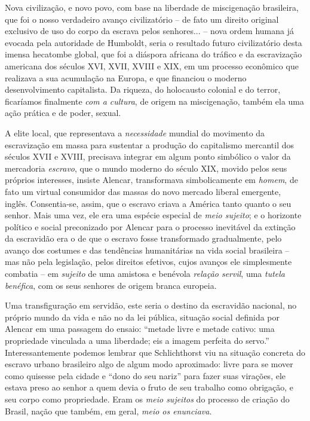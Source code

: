 Nova civilização, e novo povo, com base na liberdade de miscigenação
brasileira, que foi o nosso verdadeiro avanço civilizatório -- de fato
um direito original exclusivo de uso do corpo da escrava pelos
senhores... -- nova ordem humana já evocada pela autoridade de Humboldt,
seria o resultado futuro civilizatório desta imensa hecatombe global,
que foi a diáspora africana do tráfico e da escravização americana dos
séculos XVI, XVII, XVIII e XIX, em um processo econômico que realizava a
sua acumulação na Europa, e que financiou o moderno desenvolvimento
capitalista. Da riqueza, do holocausto colonial e do terror, ficaríamos
finalmente \emph{com a cultura}, de origem na miscigenação, também ela
uma ação prática e de poder, sexual.

A elite local, que representava a \emph{necessidade} mundial do
movimento da escravização em massa para sustentar a produção do
capitalismo mercantil dos séculos XVII e XVIII, precisava integrar em
algum ponto simbólico o valor da mercadoria \emph{escravo}, que o mundo
moderno do século XIX, movido pelos seus próprios interesses, insiste
Alencar, transformava simbolicamente em \emph{homem}, de fato um virtual
consumidor das massas do novo mercado liberal emergente, inglês.
Consentia-se, assim, que o escravo criava a América tanto quanto o seu
senhor. Mais uma vez, ele era uma espécie especial de \emph{meio
sujeito}; e o horizonte político e social preconizado por Alencar para o
processo inevitável da extinção da escravidão era o de que o escravo
fosse transformado gradualmente, pelo avanço dos costumes e das
tendências humanitárias na vida social brasileira -- mas não pela
legislação, pelos direitos efetivos, cujos avanços ele simplesmente
combatia -- em \emph{sujeito} de uma amistosa e benévola \emph{relação
servil}, uma \emph{tutela benéfica}, com os seus senhores de origem
branca europeia.

Uma transfiguração em servidão, este seria o destino da escravidão
nacional, no próprio mundo da vida e não no da lei pública, situação
social definida por Alencar em uma passagem do ensaio: ``metade livre e
metade cativo: uma propriedade vinculada a uma liberdade; eis a imagem
perfeita do servo.'' Interessantemente podemos lembrar que Schlichthorst
viu na situação concreta do escravo urbano brasileiro algo de algum modo
aproximado: livre para se mover como quisesse pela cidade e ``dono do
seu nariz'' para fazer suas virações, ele estava preso ao senhor a quem
devia o fruto de seu trabalho como obrigação, e seu corpo como
propriedade. Eram os \emph{meio sujeitos} do processo de criação do
Brasil, nação que também, em geral, \emph{meio os enunciava}.

